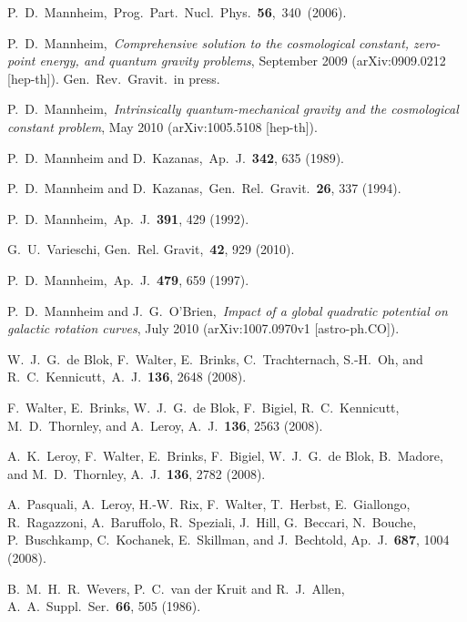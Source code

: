 \documentclass[preprint,aps]{revtex4}
\begin{document}
\begin{thebibliography}{}



 P.~D.~Mannheim,~Prog.~Part.~Nucl.~Phys.~{\bf 56},~340~(2006). 

 P.~D.~Mannheim,~{\it Comprehensive solution to the cosmological constant, zero-point energy, and quantum gravity problems}, September 2009 (arXiv:0909.0212 [hep-th]). Gen.~Rev.~Gravit.~in press.

 P.~D.~Mannheim,~{\it Intrinsically quantum-mechanical gravity and the cosmological constant problem}, May 2010 (arXiv:1005.5108 [hep-th]). 

 P.~D.~Mannheim and D.~Kazanas,~Ap.~J.~{\bf 342}, 635 (1989).

 P.~D.~Mannheim and D.~Kazanas,~Gen.~Rel.~Gravit.~{\bf 26}, 337 (1994).

 P.~D.~Mannheim,~Ap.~J.~{\bf 391}, 429 (1992). 




 G.~U.~Varieschi, Gen.~Rel. Gravit,~{\bf 42}, 929 (2010).


 P.~D.~Mannheim,~Ap.~J.~{\bf 479}, 659 (1997).

 P.~D.~Mannheim and J.~G.~O'Brien,~{\it Impact of a global quadratic potential on galactic rotation curves}, July 2010 (arXiv:1007.0970v1  [astro-ph.CO]). 



 W.~J.~G.~de Blok, F.~Walter, E.~Brinks, C.~Trachternach, S.-H.~Oh, and R.~C.~Kennicutt,~A.~J.~{\bf 136}, 2648 (2008).

 F.~Walter, E.~Brinks, W.~J.~G.~de Blok, F.~Bigiel, R.~C.~Kennicutt, M.~D.~Thornley, and A.~Leroy, A.~J.~{\bf 136},  2563 (2008).

 A.~K.~Leroy, F.~Walter, E.~Brinks, F.~Bigiel, W.~J.~G.~de Blok, B.~Madore, and M.~D.~Thornley, A.~J.~{\bf 136},  2782 (2008).



 A.~Pasquali, A.~Leroy, H.-W.~Rix, F.~Walter, T.~Herbst, E.~Giallongo, R.~Ragazzoni, A.~Baruffolo, R.~Speziali, J.~Hill, G.~Beccari, N.~Bouche, P.~Buschkamp, C.~Kochanek, E.~Skillman, and J.~Bechtold, Ap.~J.~{\bf  687}, 1004 (2008).

 B.~M.~H.~R.~Wevers, P.~C.~van der Kruit and R.~J.~Allen,  A.~A.~Suppl.~Ser.~{\bf  66}, 505 (1986).


\end{thebibliography}
\end{document}
